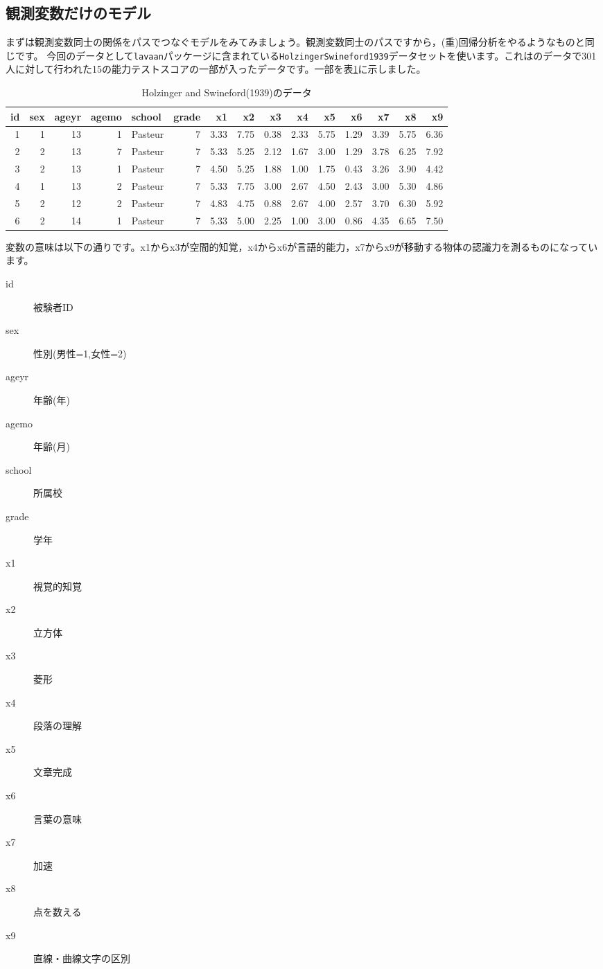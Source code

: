 \documentclass{ltjsbook}
\begin{document}
\subsection{観測変数だけのモデル}
まずは観測変数同士の関係をパスでつなぐモデルをみてみましょう。観測変数同士のパスですから，(重)回帰分析をやるようなものと同じです。
今回のデータとして\texttt{lavaan}パッケージに含まれている\texttt{HolzingerSwineford1939}データセットを使います。これは\textcite{holzinger1939study}のデータで301人に対して行われた15の能力テストスコアの一部が入ったデータです。一部を表\ref{tbl:13_01}に示しました。
\begin{table}[ht]

	\caption{Holzinger and Swineford(1939)のデータ}
	\centering
	\begin{tabular}[t]{rrrrlrrrrrrrrrr}
		\hline
		id & sex & ageyr & agemo & school  & grade & x1   & x2   & x3   & x4   & x5   & x6   & x7   & x8   & x9   \\
		\hline
		1  & 1   & 13    & 1     & Pasteur & 7     & 3.33 & 7.75 & 0.38 & 2.33 & 5.75 & 1.29 & 3.39 & 5.75 & 6.36 \\
		2  & 2   & 13    & 7     & Pasteur & 7     & 5.33 & 5.25 & 2.12 & 1.67 & 3.00 & 1.29 & 3.78 & 6.25 & 7.92 \\
		3  & 2   & 13    & 1     & Pasteur & 7     & 4.50 & 5.25 & 1.88 & 1.00 & 1.75 & 0.43 & 3.26 & 3.90 & 4.42 \\
		4  & 1   & 13    & 2     & Pasteur & 7     & 5.33 & 7.75 & 3.00 & 2.67 & 4.50 & 2.43 & 3.00 & 5.30 & 4.86 \\
		5  & 2   & 12    & 2     & Pasteur & 7     & 4.83 & 4.75 & 0.88 & 2.67 & 4.00 & 2.57 & 3.70 & 6.30 & 5.92 \\
		6  & 2   & 14    & 1     & Pasteur & 7     & 5.33 & 5.00 & 2.25 & 1.00 & 3.00 & 0.86 & 4.35 & 6.65 & 7.50 \\
		\hline
	\end{tabular}
	\label{tbl:13_01}
\end{table}
変数の意味は以下の通りです。x1からx3が空間的知覚，x4からx6が言語的能力，x7からx9が移動する物体の認識力を測るものになっています。
\begin{description}
	\item[id] 被験者ID
	\item[sex] 性別(男性=1,女性=2)
	\item[ageyr] 年齢(年)
	\item[agemo] 年齢(月)
	\item[school] 所属校
	\item[grade] 学年
	\item[x1] 視覚的知覚
	\item[x2] 立方体
	\item[x3] 菱形
	\item[x4] 段落の理解
	\item[x5] 文章完成
	\item[x6] 言葉の意味
	\item[x7] 加速
	\item[x8] 点を数える
	\item[x9] 直線・曲線文字の区別
\end{description}
\end{document}

